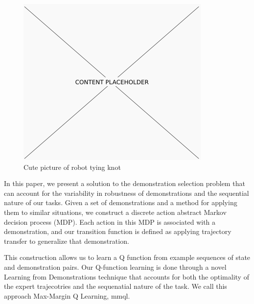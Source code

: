 \begin{figure}[t]
  \centering
    \includegraphics[width=0.9\linewidth]{figures/placeholder.png}
  \caption{Cute picture of robot tying knot}
  \label{fig:frontfig}
\end{figure}



In this paper, we present a solution to the demonstration selection problem that
can account for the variability in robustness of demonstrations and the
sequential nature of our tasks.  Given a set of demonstrations and a method for
applying them to similar situations, we construct a discrete action abstract
Markov decision process (MDP).  Each action in this MDP is associated with a
demonstration, and our transition function is defined as applying trajectory
transfer to generalize that demonstration.


This construction allows us to learn a Q function from example sequences of 
state and demonstration pairs.
Our Q-function learning is done through a novel Learning from Demonstrations
technique that accounts for both the optimality of the expert trajecotries and the
sequenatial nature of the task.
We call this approach Max-Margin Q Learning, {\sc mmql}.

